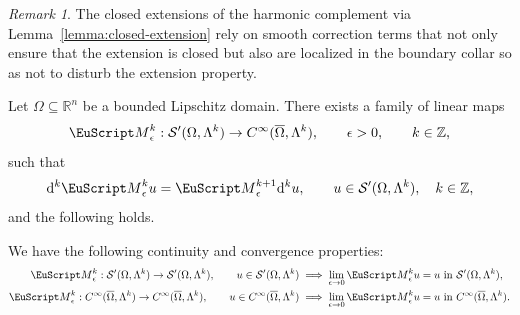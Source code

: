 \documentclass[10pt,a4paper]{amsart}
\theoremstyle{definition}
\theoremstyle{remark}
\newtheorem{remark}[theorem]{Remark}
\numberwithin{equation}{section}
\newcommand{\bbR}{{\mathbb R}}
\newcommand{\bbZ}{{\mathbb Z}}
\newcommand{\calS}{{\mathcal S}}
\newcommand{\euM}{{\EuScript M}}
\newcommand{\closure}{\overline}
\newcommand{\cartan}{{\mathrm d}}
\newcommand{\Domain}{{\Omega}}
\newcommand{\Alt}[1]{\Lambda^{#1}}
\newcommand{\Mollifier}{{\euM}}
\begin{document}
\begin{remark}
    The closed extensions of the harmonic complement via Lemma~\ref{lemma:closed-extension} rely on smooth correction terms that not only ensure that the extension is closed but also are localized in the boundary collar so as not to disturb the extension property.
\end{remark}

\begin{theorem}\label{theorem:commuting-mollification}
    Let $\Domain \subseteq \bbR^{n}$ be a bounded Lipschitz domain. 
    There exists a family of linear maps 
    \begin{align}\label{math:commuting-mollifier}
        \Mollifier^{k}_{\epsilon} : \calS'(\Domain,\Alt{k}) \to C^{\infty}(\closure\Domain,\Alt{k}), 
        \qquad 
        \epsilon > 0,
        \qquad 
        k \in \bbZ,
    \end{align}
    such that 
    \begin{align*}
        \cartan^{k} \Mollifier^{k}_{\epsilon} u = \Mollifier^{k+1}_{\epsilon} \cartan^{k} u, 
        \qquad 
        u \in \calS'(\Domain,\Alt{k}), \quad k \in \bbZ,
    \end{align*}
    and the following holds. 
    
    We have the following continuity and convergence properties:
    \begin{subequations}
        \begin{align*}
            \Mollifier^{k}_{\epsilon} : \calS'(\Domain,\Alt{k}) \to \calS'(\Domain,\Alt{k}),
            \qquad 
            u \in \calS'(\Domain,\Alt{k})
            &
            \implies
            \lim_{\epsilon \to 0} \Mollifier^{k}_{\epsilon} u = u \textrm{ in } \calS'(\Domain,\Alt{k})
            ,
            \\
            \Mollifier^{k}_{\epsilon} : C^{\infty}(\closure\Domain,\Alt{k}) \to C^{\infty}(\closure\Domain,\Alt{k}),
            \qquad 
            u \in C^{\infty}(\closure\Domain,\Alt{k})
            &
            \implies
            \lim_{\epsilon \to 0} \Mollifier^{k}_{\epsilon} u = u \textrm{ in } C^{\infty}(\closure\Domain,\Alt{k})
            .
        \end{align*}
    \end{subequations}
    

\end{theorem}
\end{document}
